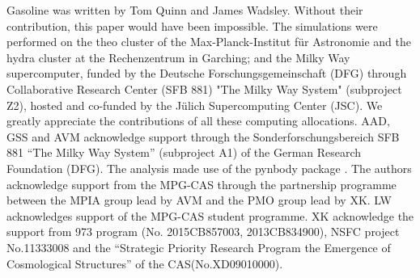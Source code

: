 \documentclass[useAMS,usenatbib]{mn2e}
\begin{document}
{\sc Gasoline} was written by Tom Quinn and James Wadsley. Without
their contribution, this paper would have been impossible.
The simulations were performed on the {\sc theo} cluster of the
Max-Planck-Institut f\"ur Astronomie and the {\sc hydra} cluster at
the Rechenzentrum in Garching; and the Milky Way supercomputer, funded
by the Deutsche Forschungsgemeinschaft (DFG) through Collaborative
Research Center (SFB 881) "The Milky Way System" (subproject Z2),
hosted and co-funded by the J\"ulich Supercomputing Center (JSC). We
greatly appreciate the contributions of all these computing
allocations.  AAD, GSS and AVM acknowledge support through the
Sonderforschungsbereich SFB 881 “The Milky Way System” (subproject A1)
of the German Research Foundation (DFG).  The analysis made use of the
pynbody package \citep{Pontzen13}.
%
The authors acknowledge support from the MPG-CAS through the
partnership programme between the MPIA group lead by AVM and the PMO
group lead by XK.
LW acknowledges support of the MPG-CAS student
programme.
XK acknowledge the support from 973 program (No. 2015CB857003, 2013CB834900),
NSFC project No.11333008 and the ``Strategic Priority Research Program the Emergence
of Cosmological Structures'' of the CAS(No.XD09010000).


\end{document}
